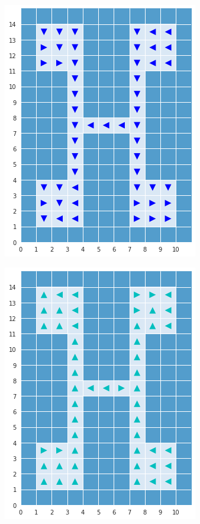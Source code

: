 \documentclass{article} %
\begin{document}
\begin{figure}[t]
    \centering
    \begin{subfigure}{0.24\columnwidth}
    \centering
    \includegraphics[scale=0.2]{figures/c2.png}
    \caption{}
    \end{subfigure}%
    \centering
    \begin{subfigure}{0.24\columnwidth}
    \centering
    \includegraphics[scale=0.2]{figures/c3.png}
    \caption{}
    \end{subfigure}

\end{figure}
\end{document}
